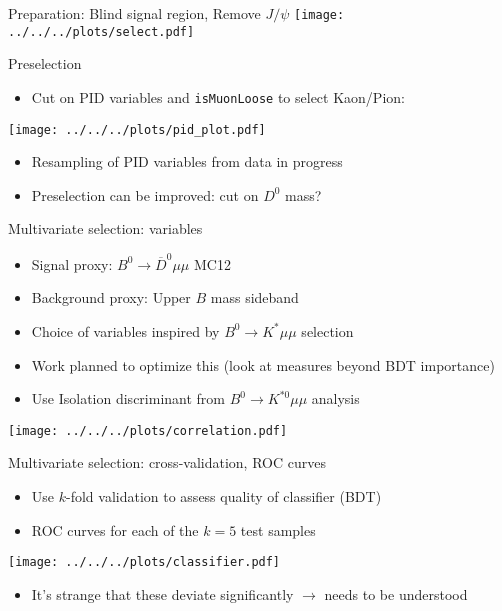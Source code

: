 \documentclass[compress,aspectratio=43]{beamer}
\begin{document}
\begin{frame}{Preparation: Blind signal region, Remove $J/\psi$}
  \centering
  \texttt{[image: ../../../plots/select.pdf]}
\end{frame}

\begin{frame}{Preselection}
  \begin{itemize}
    \item {\small Cut on PID variables and \texttt{isMuonLoose} to select Kaon/Pion:}
  \end{itemize}
  \centering
  \texttt{[image: ../../../plots/pid\_plot.pdf]}
  \begin{itemize}
    \item Resampling of PID variables from data in progress
    \item Preselection can be improved: cut on $D^0$ mass?
  \end{itemize}
\end{frame}

\begin{frame}[shrink=20]{Multivariate selection: variables}
  \begin{itemize}
    \item Signal proxy: $B^0\to \overline{D}^0\mu\mu$ MC12
    \item Background proxy: Upper $B$ mass sideband
    \item Choice of variables inspired by $B^0\to K^*\mu\mu$ selection
    \item Work planned to optimize this (look at measures beyond BDT importance)
    \item Use Isolation discriminant from $B^0\to K^{*0}\mu\mu$ analysis
  \end{itemize}
  \centering
  \texttt{[image: ../../../plots/correlation.pdf]}
\end{frame}

\begin{frame}[shrink=20]{Multivariate selection: cross-validation, ROC curves}
  \begin{itemize}
    \item Use $k$-fold validation to assess quality of classifier (BDT)
    \item ROC curves for each of the $k=5$ test samples
  \end{itemize}

  \centering
  \texttt{[image: ../../../plots/classifier.pdf]}

  \begin{itemize}
    \item It's strange that these deviate significantly $\rightarrow$ needs to be understood
  \end{itemize}
\end{frame}
\end{document}
